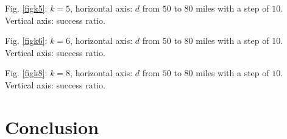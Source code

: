 \documentclass[conference]{IEEEtran}
\theoremstyle{definition}
\begin{document}
Fig. \ref{figk5}: $k=5$, horizontal axis: $d$ from $50$ to $80$ miles with a step of $10$. Vertical axis: success ratio.

Fig. \ref{figk6}: $k=6$, horizontal axis: $d$ from $50$ to $80$ miles with a step of $10$. Vertical axis: success ratio.

Fig. \ref{figk8}: $k=8$, horizontal axis: $d$ from $50$ to $80$ miles with a step of $10$. Vertical axis: success ratio.

\section{Conclusion} \label{conclusion}



\end{document}

